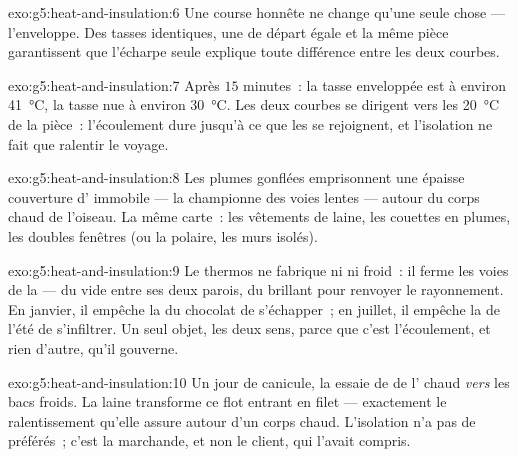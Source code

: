 \begin{solution}{exo:g5:heat-and-insulation:6}
Une course honnête ne change qu'une seule chose --- l'enveloppe. Des
tasses identiques, une  de départ égale et la même pièce
garantissent que l'écharpe seule explique toute différence entre les
deux courbes.
\end{solution}

\begin{solution}{exo:g5:heat-and-insulation:7}
Après $15$ minutes~: la tasse enveloppée est à environ
\qty{41}{\celsius}, la tasse nue à environ \qty{30}{\celsius}. Les
deux courbes se dirigent vers les \qty{20}{\celsius} de la pièce~:
l'écoulement dure jusqu'à ce que les  se rejoignent, et
l'isolation ne fait que ralentir le voyage.
\end{solution}

\begin{solution}{exo:g5:heat-and-insulation:8}
Les plumes gonflées emprisonnent une épaisse couverture d'
immobile --- la championne des voies lentes --- autour du corps chaud
de l'oiseau. La même carte~: les vêtements de laine, les couettes en
plumes, les doubles fenêtres (ou la polaire, les murs isolés).
\end{solution}

\begin{solution}{exo:g5:heat-and-insulation:9}
Le thermos ne fabrique ni  ni froid~: il ferme les voies de la
 --- du vide entre ses deux parois, du brillant pour renvoyer
le rayonnement. En janvier, il empêche la  du chocolat de
s'échapper~; en juillet, il empêche la  de l'été de s'infiltrer.
Un seul objet, les deux sens, parce que c'est l'écoulement, et rien
d'autre, qu'il gouverne.
\end{solution}

\begin{solution}{exo:g5:heat-and-insulation:10}
Un jour de canicule, la  essaie de  de l' chaud
\emph{vers} les bacs froids. La laine transforme ce flot entrant en
filet --- exactement le ralentissement qu'elle assure autour d'un
corps chaud. L'isolation n'a pas de préférés~; c'est la marchande, et
non le client, qui l'avait compris.
\end{solution}

